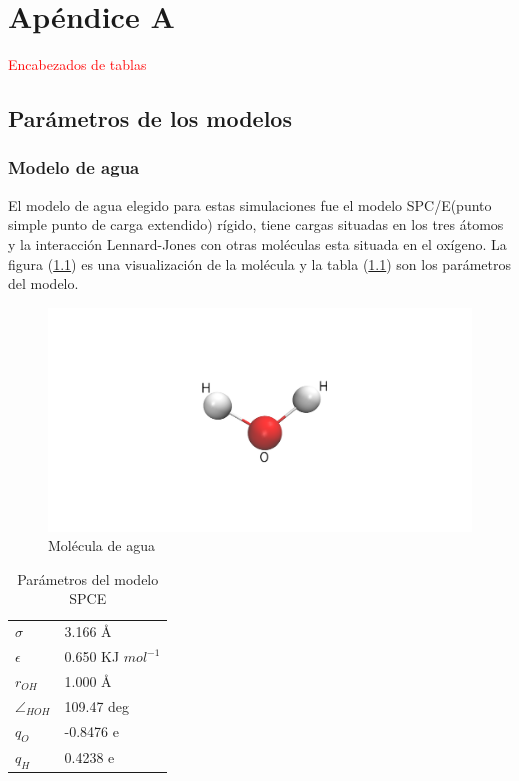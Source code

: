 \chapter{Apéndice A}\label{chapter:apendicea}

\textcolor{red}{Encabezados de tablas}

\section{Parámetros de los modelos}

\subsection{Modelo de agua}

El modelo de agua elegido para estas simulaciones fue el modelo SPC/E(punto simple punto de carga extendido) rígido, tiene cargas situadas en los tres átomos y la interacción Lennard-Jones con otras moléculas esta situada en el oxígeno. La figura (\ref{fig:SPCE}) es una visualización de la molécula y la tabla (\ref{SPCEpar}) son los parámetros del modelo.

\begin{figure}[!h]
    \centering
    \includegraphics[width=.9\textwidth,keepaspectratio=true]{SPCE.png}
    \caption{Molécula de agua}
    \label{fig:SPCE}
\end{figure}

\begin{table}[h!]
    \centering

    \begin{tabular}{ |p{1cm}|p{4cm}|  }
    \hline
    $\sigma$  & 3.166 \AA \\
    $\epsilon$& 0.650 KJ $mol^{-1}$ \\
    $r_{OH}$  & 1.000 \AA \\
    $\angle_{HOH}$&109.47 deg \\
    $q_{O}$   & -0.8476 e \\
    $q_{H}$   & 0.4238 e \\
    \hline
    \end{tabular}
    \caption{Parámetros del modelo SPCE}
    \label{SPCEpar}
\end{table}

